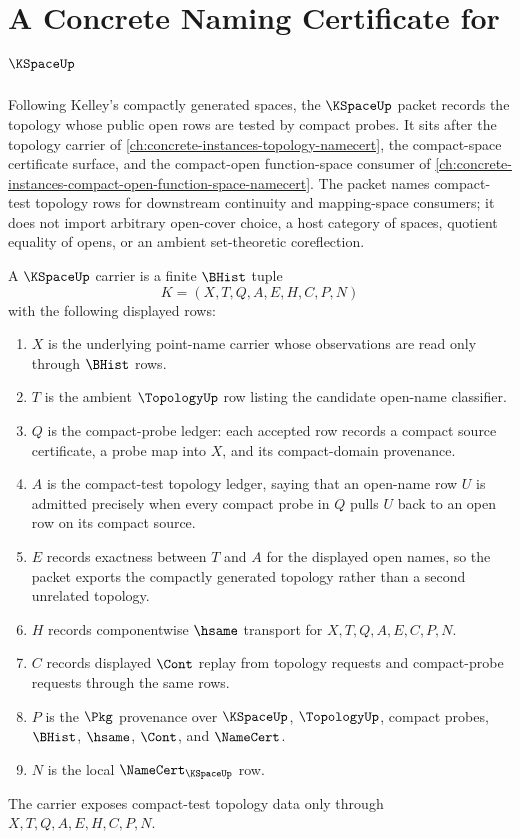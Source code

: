 \chapter{A Concrete Naming Certificate for $\KSpaceUp$}
\label{ch:concrete-instances-k-space-namecert}

Following Kelley's compactly generated spaces, the $\KSpaceUp$ packet records the topology whose public open rows are tested by compact probes. It sits after the topology carrier of \autoref{ch:concrete-instances-topology-namecert}, the compact-space certificate surface, and the compact-open function-space consumer of \autoref{ch:concrete-instances-compact-open-function-space-namecert}. The packet names compact-test topology rows for downstream continuity and mapping-space consumers; it does not import arbitrary open-cover choice, a host category of spaces, quotient equality of opens, or an ambient set-theoretic coreflection.

\begin{definition}
\label{def:k-space-carrier}
A $\KSpaceUp$ carrier is a finite $\BHist$ tuple
$$
K=(X,T,Q,A,E,H,C,P,N)
$$
with the following displayed rows:
\begin{enumerate}
\item $X$ is the underlying point-name carrier whose observations are read only through $\BHist$ rows.
\item $T$ is the ambient $\TopologyUp$ row listing the candidate open-name classifier.
\item $Q$ is the compact-probe ledger: each accepted row records a compact source certificate, a probe map into $X$, and its compact-domain provenance.
\item $A$ is the compact-test topology ledger, saying that an open-name row $U$ is admitted precisely when every compact probe in $Q$ pulls $U$ back to an open row on its compact source.
\item $E$ records exactness between $T$ and $A$ for the displayed open names, so the packet exports the compactly generated topology rather than a second unrelated topology.
\item $H$ records componentwise $\hsame$ transport for $X,T,Q,A,E,C,P,N$.
\item $C$ records displayed $\Cont$ replay from topology requests and compact-probe requests through the same rows.
\item $P$ is the $\Pkg$ provenance over $\KSpaceUp$, $\TopologyUp$, compact probes, $\BHist$, $\hsame$, $\Cont$, and $\NameCert$.
\item $N$ is the local $\NameCert_{\KSpaceUp}$ row.
\end{enumerate}
The carrier exposes compact-test topology data only through $X,T,Q,A,E,H,C,P,N$.
\end{definition}

